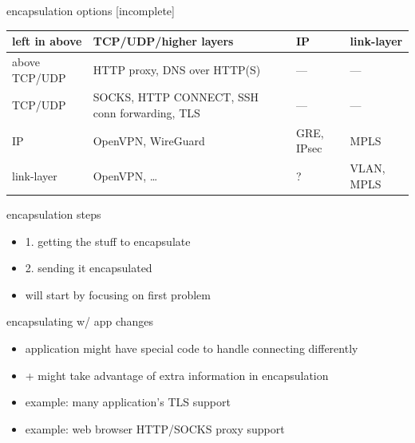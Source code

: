 \begin{frame}{encapsulation options [incomplete]}
\small
\begin{tabular}{l||p{4cm}|p{4cm}|p{2cm}}
left in above       & TCP/UDP/higher layers & IP & link-layer \\ \hline \hline
above TCP/UDP       & HTTP proxy, DNS over HTTP(S) & --- & --- \\ \hline
TCP/UDP             & SOCKS, HTTP CONNECT, SSH conn forwarding, TLS & --- & --- \\\hline
IP                  & OpenVPN, WireGuard & GRE, IPsec & MPLS \\\hline
link-layer          & OpenVPN, \ldots & ? & VLAN, MPLS \\\hline
\end{tabular}
\end{frame}

\begin{frame}{encapsulation steps}
    \begin{itemize}
    \item 1. getting the stuff to encapsulate
    \item 2. sending it encapsulated
    \vspace{.5cm}
    \item will start by focusing on first problem
    \end{itemize}
\end{frame}

\begin{frame}[label=encapChanges]{encapsulating w/ app changes}
    \begin{itemize}
    \item application might have special code to handle connecting differently
    \item + might take advantage of extra information in encapsulation
    \vspace{.5cm}
    \item example: many application's TLS support
    \item example: web browser HTTP/SOCKS proxy support
    \end{itemize}
\end{frame}

